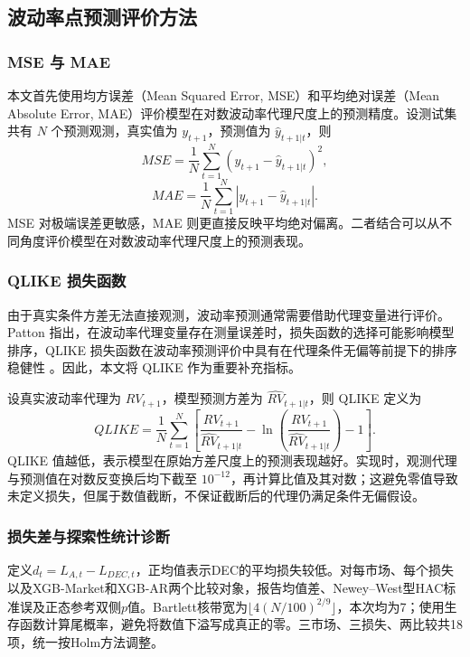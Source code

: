 \subsection{波动率点预测评价方法}

\subsubsection{MSE 与 MAE}

本文首先使用均方误差（Mean Squared Error, MSE）和平均绝对误差（Mean Absolute Error, MAE）评价模型在对数波动率代理尺度上的预测精度。设测试集共有 \(N\) 个预测观测，真实值为 \(y_{t+1}\)，预测值为 \(\hat{y}_{t+1|t}\)，则
\begin{equation}
	MSE
	=
	\frac{1}{N}
	\sum_{t=1}^{N}
	\left(
	y_{t+1}-\hat{y}_{t+1|t}
	\right)^2,
\end{equation}
\begin{equation}
	MAE
	=
	\frac{1}{N}
	\sum_{t=1}^{N}
	\left|
	y_{t+1}-\hat{y}_{t+1|t}
	\right|.
\end{equation}
MSE 对极端误差更敏感，MAE 则更直接反映平均绝对偏离。二者结合可以从不同角度评价模型在对数波动率代理尺度上的预测表现。

\subsubsection{QLIKE 损失函数}

由于真实条件方差无法直接观测，波动率预测通常需要借助代理变量进行评价。Patton 指出，在波动率代理变量存在测量误差时，损失函数的选择可能影响模型排序，QLIKE 损失函数在波动率预测评价中具有在代理条件无偏等前提下的排序稳健性 \citep{Patton2011}。因此，本文将 QLIKE 作为重要补充指标。

设真实波动率代理为 \(RV_{t+1}\)，模型预测方差为 \(\widehat{RV}_{t+1|t}\)，则 QLIKE 定义为
\begin{equation}
	QLIKE
	=
	\frac{1}{N}
	\sum_{t=1}^{N}
	\left[
	\frac{RV_{t+1}}{\widehat{RV}_{t+1|t}}
	-
	\ln
	\left(
	\frac{RV_{t+1}}{\widehat{RV}_{t+1|t}}
	\right)
	-
	1
	\right].
\end{equation}
QLIKE 值越低，表示模型在原始方差尺度上的预测表现越好。实现时，观测代理与预测值在对数反变换后均下截至 $10^{-12}$，再计算比值及其对数；这避免零值导致未定义损失，但属于数值截断，不保证截断后的代理仍满足条件无偏假设。

\subsubsection{损失差与探索性统计诊断}
定义$d_t=L_{A,t}-L_{DEC,t}$，正均值表示DEC的平均损失较低。对每市场、每个损失以及XGB-Market和XGB-AR两个比较对象，报告均值差、Newey--West型HAC标准误及正态参考双侧$p$值\citep{DieboldMariano1995,NeweyWest1987}。Bartlett核带宽为$\lfloor4(N/100)^{2/9}\rfloor$，本次均为7；使用生存函数计算尾概率，避免将数值下溢写成真正的零。三市场、三损失、两比较共18项，统一按Holm方法调整\citep{Holm1979}。

